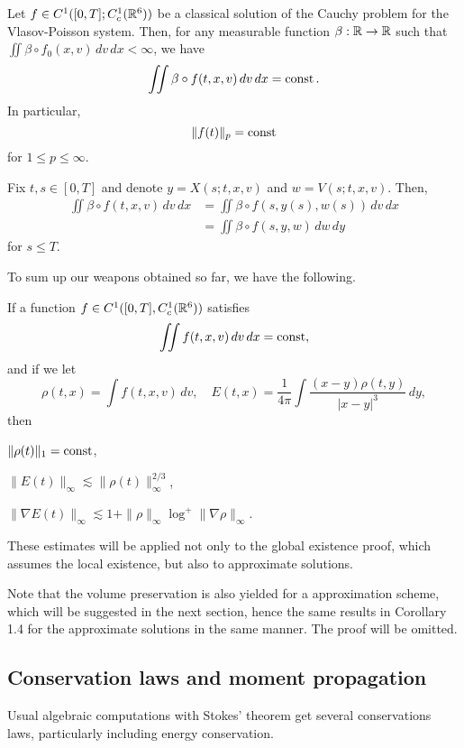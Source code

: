 \documentclass[12pt]{article}
\begin{document}
\begin{cor}
Let $f\in C^1([0,T];C_c^1(\mathbb{R}^6))$ be a classical solution of the Cauchy problem for the Vlasov-Poisson system.
Then, for any measurable function $\beta:\mathbb{R}\to\mathbb{R}$ such that $\iint\beta\circ f_0(x,v)\,dv\,dx<\infty$, we have
\[\iint\beta\circ f(t,x,v)\,dv\,dx=\operatorname{const}.\]
In particular,
\[\|f(t)\|_p=\operatorname{const}\]
for $1\le p\le\infty$.
\end{cor}
\begin{pf}
Fix $t,s\in[0,T]$ and denote $y=X(s;t,x,v)$ and $w=V(s;t,x,v)$.
Then,
\begin{align*}
\iint\beta\circ f(t,x,v)\,dv\,dx
&=\iint\beta\circ f(s,y(s),w(s))\,dv\,dx\\
&=\iint\beta\circ f(s,y,w)\,dw\,dy
\end{align*}
for $s\le T$.
\end{pf}

To sum up our weapons obtained so far, we have the following.
\begin{cor}
If a function $f\in C^1([0,T],C_c^1(\mathbb{R}^6))$ satisfies
\[\iint f(t,x,v)\,dv\,dx=\operatorname{const},\]
and if we let
\[\rho(t,x)=\int f(t,x,v)\,dv,\quad E(t,x)=\frac1{4\pi}\int\frac{(x-y)\rho(t,y)}{|x-y|^3}\,dy,\]
then
\begin{parts}
\item $\|\rho(t)\|_1=\operatorname{const}$,
\item $\|E(t)\|_\infty\lesssim\|\rho(t)\|_\infty^{2/3}$,
\item $\|\nabla E(t)\|_\infty\lesssim1+\|\rho\|_\infty\log^+\|\nabla\rho\|_\infty$.
\end{parts}
\end{cor}
These estimates will be applied not only to the global existence proof, which assumes the local existence, but also to approximate solutions.

\begin{rmk}
Note that the volume preservation is also yielded for a approximation scheme, which will be suggested in the next section, hence the same results in Corollary 1.4 for the approximate solutions in the same manner.
The proof will be omitted.
\end{rmk}


\subsection{Conservation laws and moment propagation}
Usual algebraic computations with Stokes' theorem get several conservations laws, particularly including energy conservation.
\end{document}
